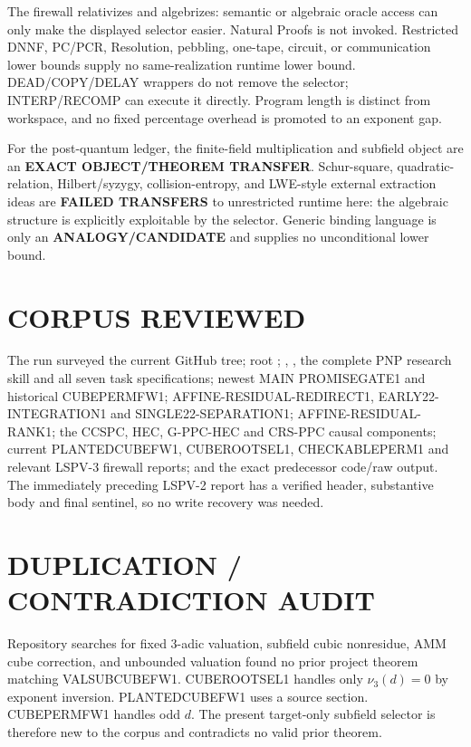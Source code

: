 \documentclass[11pt]{article}
\begin{document}
The firewall relativizes and algebrizes: semantic or algebraic oracle access
can only make the displayed selector easier.  Natural Proofs is not invoked.
Restricted DNNF, PC/PCR, Resolution, pebbling, one-tape, circuit, or
communication lower bounds supply no same-realization runtime lower bound.
DEAD/COPY/DELAY wrappers do not remove the selector; INTERP/RECOMP can execute
it directly.  Program length is distinct from workspace, and no fixed
percentage overhead is promoted to an exponent gap.

For the post-quantum ledger, the finite-field multiplication and subfield
object are an \textbf{EXACT OBJECT/THEOREM TRANSFER}.  Schur-square,
quadratic-relation, Hilbert/syzygy, collision-entropy, and LWE-style external
extraction ideas are \textbf{FAILED TRANSFERS} to unrestricted runtime here:
the algebraic structure is explicitly exploitable by the selector.  Generic
binding language is only an \textbf{ANALOGY/CANDIDATE} and supplies no
unconditional lower bound.

\section{CORPUS REVIEWED}
The run surveyed the current GitHub tree; root ;
, , the complete PNP research skill and all
seven task specifications; newest MAIN PROMISEGATE1 and historical
CUBEPERMFW1; AFFINE-RESIDUAL-REDIRECT1, EARLY22-INTEGRATION1 and
SINGLE22-SEPARATION1; AFFINE-RESIDUAL-RANK1; the CCSPC, HEC, G-PPC-HEC and
CRS-PPC causal components; current PLANTEDCUBEFW1, CUBEROOTSEL1,
CHECKABLEPERM1 and relevant LSPV-3 firewall reports; and the exact predecessor
code/raw output.  The immediately preceding LSPV-2 report has a verified
header, substantive body and final sentinel, so no write recovery was needed.

\section{DUPLICATION / CONTRADICTION AUDIT}
Repository searches for fixed $3$-adic valuation, subfield cubic nonresidue,
AMM cube correction, and unbounded valuation found no prior project theorem
matching VALSUBCUBEFW1.  CUBEROOTSEL1 handles only $\nu_3(d)=0$ by exponent
inversion.  PLANTEDCUBEFW1 uses a source section.  CUBEPERMFW1 handles odd
$d$.  The present target-only subfield selector is therefore new to the
corpus and contradicts no valid prior theorem.
\end{document}
